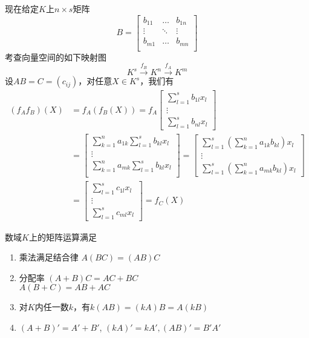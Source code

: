 \documentclass[11pt]{article}
\begin{document}
现在给定\(K\)上\(n\times s\)矩阵
\begin{equation*}
B=
\begin{bmatrix}
b_{11}&\dots&b_{1n}\\
\vdots&\ddots&\vdots\\
b_{m1}&\dots&b_{mn}\\
\end{bmatrix}
\end{equation*}
考查向量空间的如下映射图
\begin{equation*}
K^s\xrightarrow{f_B}K^n\xrightarrow{f_A}K^m
\end{equation*}
设\(AB=C=(c_{ij})\)，对任意\(X\in K^s\)，我们有
\begin{align*}
(f_Af_B)(X)&=f_A(f_B(X))=f_A
\begin{bmatrix}
\sum_{l=1}^sb_{1l}x_l\\
\vdots\\
\sum_{l=1}^sb_{nl}x_l
\end{bmatrix}\\
&=
\begin{bmatrix}
\sum_{k=1}^na_{1k}\sum_{l=1}^sb_{kl}x_l\\
\vdots\\
\sum_{k=1}^na_{mk}\sum_{l=1}^sb_{kl}x_l\\
\end{bmatrix}=
\begin{bmatrix}
\sum_{l=1}^s\left(\sum_{k=1}^na_{1k}b_{kl} \right)x_l\\
\vdots\\
\sum_{l=1}^s\left(\sum_{k=1}^na_{mk}b_{kl} \right)x_l
\end{bmatrix}\\
&=
\begin{bmatrix}
\sum_{l=1}^sc_{1l}x_l\\\vdots\\
\sum_{l=1}^sc_{ml}x_l
\end{bmatrix}=f_C(X)
\end{align*}

\begin{proposition}[]
数域\(K\)上的矩阵运算满足
\begin{enumerate}
\item 乘法满足结合律 \(A(BC)=(AB)C\)
\item 分配率 \((A+B)C=AC+BC\)\\
\(A(B+C)=AB+AC\)
\item 对\(K\)内任一数\(k\)，有\(k(AB)=(kA)B=A(kB)\)
\item \((A+B)'=A'+B'\), \((kA)'=kA',(AB)'=B'A'\)
\end{enumerate}
\end{proposition}
\end{document}
